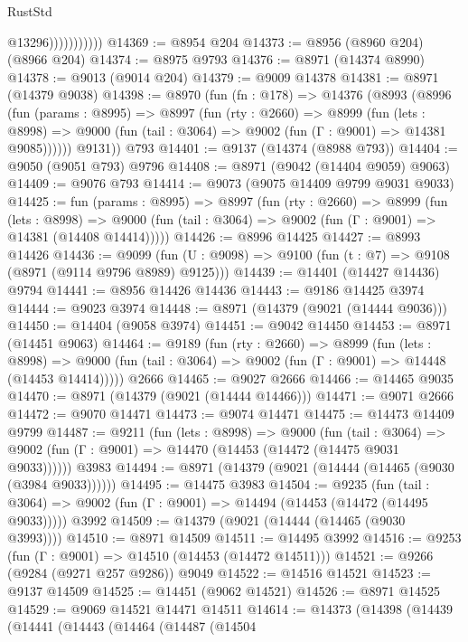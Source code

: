 \begin{lexlean}{RustStd}
\begin{coremodule}
                          @13296)))))))))))
@14369 := @8954 @204
@14373 := @8956 (@8960 @204) (@8966 @204)
@14374 := @8975 @9793
@14376 := @8971 (@14374 @8990)
@14378 := @9013 (@9014 @204)
@14379 := @9009 @14378
@14381 := @8971 (@14379 @9038)
@14398 := @8970
    (fun (fn : @178) =>
    @14376
      (@8993
        (@8996
          (fun (params : @8995) =>
          @8997
            (fun (rty : @2660) =>
            @8999
              (fun (lets : @8998) =>
              @9000 (fun (tail : @3064) => @9002 (fun (Γ : @9001) => @14381 @9085))))))
        @9131))
    @793
@14401 := @9137 (@14374 (@8988 @793))
@14404 := @9050 (@9051 @793) @9796
@14408 := @8971 (@9042 (@14404 @9059) @9063)
@14409 := @9076 @793
@14414 := @9073 (@9075 @14409 @9799 @9031 @9033)
@14425 := fun (params : @8995) =>
  @8997
    (fun (rty : @2660) =>
    @8999
      (fun (lets : @8998) =>
      @9000 (fun (tail : @3064) => @9002 (fun (Γ : @9001) => @14381 (@14408 @14414)))))
@14426 := @8996 @14425
@14427 := @8993 @14426
@14436 := @9099 (fun (U : @9098) => @9100 (fun (t : @7) => @9108 (@8971 (@9114 @9796 @8989) @9125)))
@14439 := @14401 (@14427 @14436) @9794
@14441 := @8956 @14426 @14436
@14443 := @9186 @14425 @3974
@14444 := @9023 @3974
@14448 := @8971 (@14379 (@9021 (@14444 @9036)))
@14450 := @14404 (@9058 @3974)
@14451 := @9042 @14450
@14453 := @8971 (@14451 @9063)
@14464 := @9189
    (fun (rty : @2660) =>
    @8999
      (fun (lets : @8998) =>
      @9000 (fun (tail : @3064) => @9002 (fun (Γ : @9001) => @14448 (@14453 @14414)))))
    @2666
@14465 := @9027 @2666
@14466 := @14465 @9035
@14470 := @8971 (@14379 (@9021 (@14444 @14466)))
@14471 := @9071 @2666
@14472 := @9070 @14471
@14473 := @9074 @14471
@14475 := @14473 @14409 @9799
@14487 := @9211
    (fun (lets : @8998) =>
    @9000
      (fun (tail : @3064) =>
      @9002 (fun (Γ : @9001) => @14470 (@14453 (@14472 (@14475 @9031 @9033))))))
    @3983
@14494 := @8971 (@14379 (@9021 (@14444 (@14465 (@9030 (@3984 @9033))))))
@14495 := @14475 @3983
@14504 := @9235
    (fun (tail : @3064) => @9002 (fun (Γ : @9001) => @14494 (@14453 (@14472 (@14495 @9033)))))
    @3992
@14509 := @14379 (@9021 (@14444 (@14465 (@9030 @3993))))
@14510 := @8971 @14509
@14511 := @14495 @3992
@14516 := @9253 (fun (Γ : @9001) => @14510 (@14453 (@14472 @14511)))
@14521 := @9266 (@9284 (@9271 @257 @9286)) @9049
@14522 := @14516 @14521
@14523 := @9137 @14509
@14525 := @14451 (@9062 @14521)
@14526 := @8971 @14525
@14529 := @9069 @14521 @14471 @14511
@14614 := @14373
    (@14398
      (@14439
        (@14441
          (@14443
            (@14464
              (@14487
                (@14504

\end{coremodule}
\end{lexlean}
